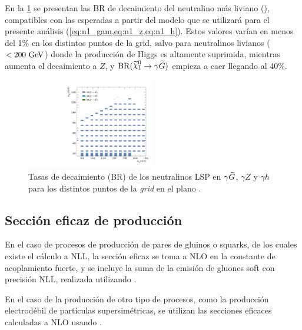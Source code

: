 En la \cref{fig:signal_br_n1} se presentan las BR de decaimiento del neutralino
más liviano (\ninoone), compatibles con las esperadas a partir del modelo que se
utilizará para el presente análisis (\cref{eq:n1_gam,eq:n1_z,eq:n1_h}). Estos
valores varían en menos del 1\% en los distintos puntos de la grid, salvo para
neutralinos livianos ($<200\gev$) donde la producción de Higgs es altamente
suprimida, mientras aumenta el decaimiento a $Z$, y $\mathrm{BR}(\ninoone \to
\gam \gravino)$ empieza a caer llegando al 40\%.

\begin{figure}[!htb]
  \centering

  \includegraphics[width=0.5\textwidth]{figures/br_n1_X}

  \caption{Tasas de decaimiento (BR) de los neutralinos LSP en $\gamma\widetilde{G}$, $\gamma Z$ y
  $\gamma h$ para los distintos puntos de la \emph{grid} en el plano \mgmn.}
  \label{fig:signal_br_n1}
\end{figure}



\subsection{Sección eficaz de producción}
\label{sec:xs_calc}

En el caso de procesos de producción de pares de gluinos o squarks, de los cuales
existe el cálculo a NLL, la sección eficaz se toma a NLO en la constante de acoplamiento
fuerte, y se incluye la suma de la emisión de gluones soft con precisión NLL,
realizada utilizando {\nllfast}\cite{Kramer:2012bx,Beenakker:1996ch,Kulesza:2008jb,Kulesza:2009kq,Beenakker:2009ha,Beenakker:2011fu}.

En el caso de la producción de otro tipo de procesos, como la producción electrodébil de
partículas supersimétricas, se utilizan
las secciones eficaces calculadas a NLO usando {\prospino} \cite{Beenakker:1996ed}.


\newcommand{\pdfcteqpm}{\ensuremath{\Delta\mathrm{PDF}^{\pm}(\mathrm{CTEQ})}}
\newcommand{\scacteqpm}{\ensuremath{\Delta\mathrm{SCA}^{\pm}(\mathrm{CTEQ})}}

